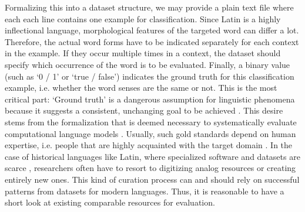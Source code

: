 \documentclass[oneside]{book}
\begin{document}
Formalizing this into a dataset structure, we may provide a plain text file where each each line contains one example for classification. Since Latin is a highly inflectional language, morphological features of the targeted word can differ a lot. Therefore, the actual word forms have to be indicated separately for each context in the example. If they occur multiple times in a context, the dataset should specify which occurrence of the word is to be evaluated. Finally, a binary value (such as `0 / 1' or `true / false') indicates the ground truth for this classification example, i.e. whether the word senses are the same or not. This is the most critical part: `Ground truth' is a dangerous assumption for linguistic phenomena because it suggests a consistent, unchanging goal to be achieved \parencite[129]{leeGeneratingGroundTruth2012}. This desire stems from the formalization that is deemed necessary to systematically evaluate computational language models \parencite[4]{fischerGroundTruthCreation2010}. Usually, such gold standards depend on human expertise, i.e. people that are highly acquainted with the target domain \parencite[519]{uzunerCommunityAnnotationExperiment2010}. In the case of historical languages like Latin, where specialized software and datasets are scarce \parencites[168]{karakantaNeuralMachineTranslation2018}[3]{mcgillivrayMethodsLatinComputational2013}, researchers often have to resort to digitizing analog resources or creating entirely new ones. This kind of curation process can and should rely on successful patterns from datasets for modern languages. Thus, it is reasonable to have a short look at existing comparable resources for evaluation.
\end{document}
